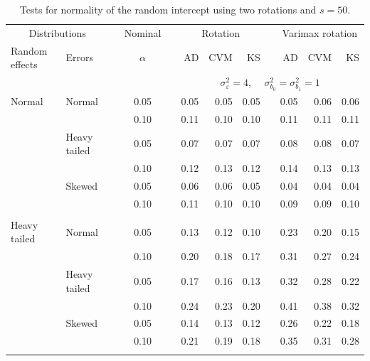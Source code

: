\documentclass[12pt]{article} %
\begin{document}
\begin{table}[ht]
\caption{Tests for normality of the random intercept using two rotations and $s = 50$.}
\begin{scriptsize}
\begin{center}
\begin{tabular}{ll p{.1cm} c p{.1cm} rrr p{.1cm} rrr}
  \hline
  \multicolumn{2}{c}{Distributions}& & Nominal & &  \multicolumn{3}{c}{Rotation} & & \multicolumn{3}{c}{Varimax rotation} \\ \cline{1-2} \cline{6-8} \cline{10-12}   
  Random effects & Errors & & $\alpha$ & & AD & CVM & KS & & AD & CVM & KS \\ 
   \hline
& && && \multicolumn{7}{c}{$\sigma_{\varepsilon}^2 = 4$, \ \ $\sigma_{b_0}^2 = \sigma_{b_1}^2 = 1$} \\ \cline{6-12}
\rowcolor{gray!20}Normal       & Normal       && 0.05 &&   0.05 & 0.05 & 0.05 && 0.05 & 0.06 & 0.06 \\ 
\rowcolor{gray!20}             &              && 0.10 &&   0.11 & 0.10 & 0.10 && 0.11 & 0.11 & 0.11 \\ 
\rowcolor{gray!20}             & Heavy tailed && 0.05 &&   0.07 & 0.07 & 0.07 && 0.08 & 0.08 & 0.07 \\ 
\rowcolor{gray!20}             &              && 0.10 &&   0.12 & 0.13 & 0.12 && 0.14 & 0.13 & 0.13 \\ 
\rowcolor{gray!20}             & Skewed       && 0.05 &&   0.06 & 0.06 & 0.05 && 0.04 & 0.04 & 0.04 \\ 
\rowcolor{gray!20}             &              && 0.10 &&   0.11 & 0.10 & 0.10 && 0.09 & 0.09 & 0.10 \\ 
             &&&&&&&&&&&\\
Heavy tailed & Normal       && 0.05 &&   0.13 & 0.12 & 0.10 && 0.23 & 0.20 & 0.15 \\ 
             &              && 0.10 &&   0.20 & 0.18 & 0.17 && 0.31 & 0.27 & 0.24 \\ 
             & Heavy tailed && 0.05 &&   0.17 & 0.16 & 0.13 && 0.32 & 0.28 & 0.22 \\ 
             &              && 0.10 &&   0.24 & 0.23 & 0.20 && 0.41 & 0.38 & 0.32 \\ 
             & Skewed       && 0.05 &&   0.14 & 0.13 & 0.12 && 0.26 & 0.22 & 0.18 \\ 
             &              && 0.10 &&   0.21 & 0.19 & 0.18 && 0.35 & 0.31 & 0.28 \\ 
             &&&&&&&&&&&\\

\end{tabular}
\end{center}
\end{scriptsize}
\end{table}
\end{document}

